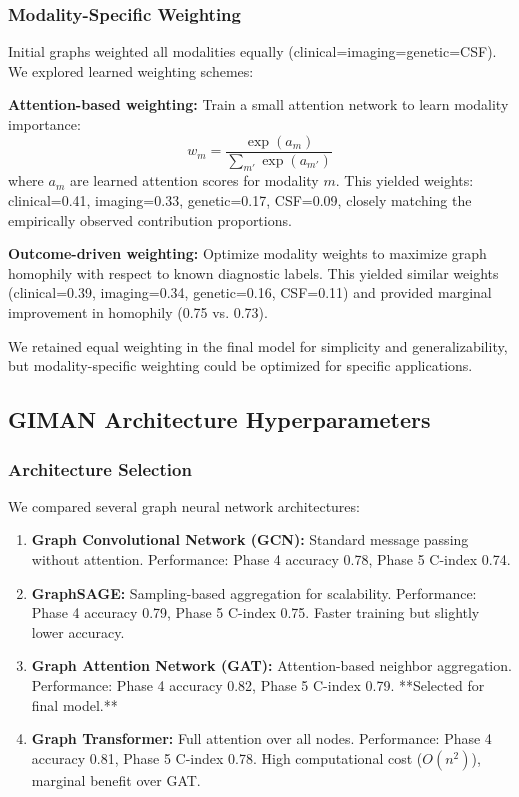 \documentclass[11pt]{article}
\begin{document}
\subsubsection{Modality-Specific Weighting}
Initial graphs weighted all modalities equally (clinical=imaging=genetic=CSF). We explored learned weighting schemes:

\textbf{Attention-based weighting:} Train a small attention network to learn modality importance:
$$w_m = \frac{\exp(a_m)}{\sum_{m'} \exp(a_{m'})}$$
where $a_m$ are learned attention scores for modality $m$. This yielded weights: clinical=0.41, imaging=0.33, genetic=0.17, CSF=0.09, closely matching the empirically observed contribution proportions.

\textbf{Outcome-driven weighting:} Optimize modality weights to maximize graph homophily with respect to known diagnostic labels. This yielded similar weights (clinical=0.39, imaging=0.34, genetic=0.16, CSF=0.11) and provided marginal improvement in homophily (0.75 vs. 0.73).

We retained equal weighting in the final model for simplicity and generalizability, but modality-specific weighting could be optimized for specific applications.

\subsection{GIMAN Architecture Hyperparameters}

\subsubsection{Architecture Selection}
We compared several graph neural network architectures:

\begin{enumerate}
    \item \textbf{Graph Convolutional Network (GCN):} Standard message passing without attention. Performance: Phase 4 accuracy 0.78, Phase 5 C-index 0.74.
    
    \item \textbf{GraphSAGE:} Sampling-based aggregation for scalability. Performance: Phase 4 accuracy 0.79, Phase 5 C-index 0.75. Faster training but slightly lower accuracy.
    
    \item \textbf{Graph Attention Network (GAT):} Attention-based neighbor aggregation. Performance: Phase 4 accuracy 0.82, Phase 5 C-index 0.79. **Selected for final model.**
    
    \item \textbf{Graph Transformer:} Full attention over all nodes. Performance: Phase 4 accuracy 0.81, Phase 5 C-index 0.78. High computational cost ($O(n^2)$), marginal benefit over GAT.
\end{enumerate}
\end{document}
